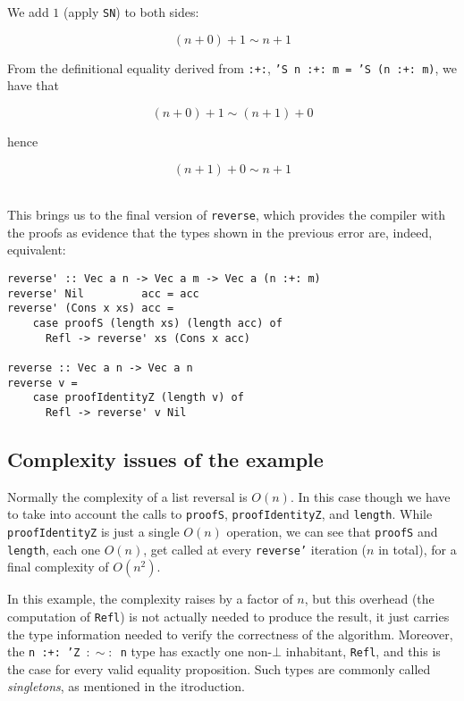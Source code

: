 We add $1$ (apply \texttt{SN}) to both sides:

$$
(n+0)+1 \sim n+1
$$

From the definitional equality derived from \texttt{:+:}, \texttt{'S n :+: m = 'S (n :+: m)}, we have that

$$
(n+0)+1 \sim (n+1)+0
$$

hence

$$
(n+1) + 0 \sim n+1
$$

\fbox{\phantom{\rule{.7ex}{.7ex}}} \\ %

This brings us to the final version of \texttt{reverse}, which provides the compiler with the proofs as evidence that the types shown in the previous error are, indeed, equivalent:

\begin{lstlisting}[caption=Length-indexed vector reversal]
reverse' :: Vec a n -> Vec a m -> Vec a (n :+: m)
reverse' Nil         acc = acc
reverse' (Cons x xs) acc =
    case proofS (length xs) (length acc) of
      Refl -> reverse' xs (Cons x acc)

reverse :: Vec a n -> Vec a n
reverse v =
    case proofIdentityZ (length v) of
      Refl -> reverse' v Nil
\end{lstlisting}

\subsection{Complexity issues of the example}
\label{subsec:complexity-issues}

Normally the complexity of a list reversal is $O(n)$.
In this case though we have to take into account the calls to \texttt{proofS}, \texttt{proofIdentityZ}, and \texttt{length}.
While \texttt{proofIdentityZ} is just a single $O(n)$ operation, we can see that \texttt{proofS} and \texttt{length}, each one $O(n)$, get called at every \texttt{reverse'} iteration ($n$ in total), for a final complexity of $O(n^2)$.

In this example, the complexity raises by a factor of $n$, but this overhead (the computation of \texttt{Refl}) is not actually needed to produce the result, it just carries the type information needed to verify the correctness of the algorithm.
Moreover, the \texttt{n :+: 'Z $:\sim:$ n} type has exactly one non-$\bot$ inhabitant, \texttt{Refl}, and this is the case for every valid equality proposition. Such types are commonly called \emph{singletons}, as mentioned in the itroduction.

